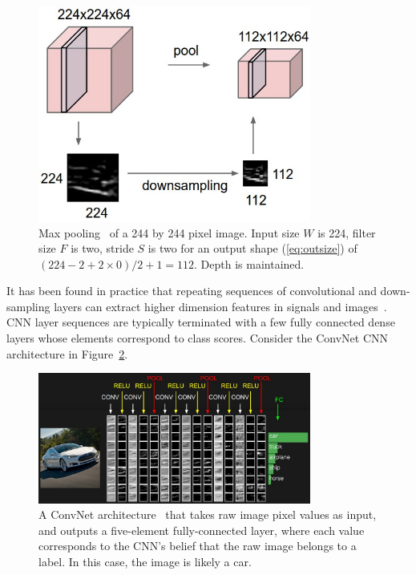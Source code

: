 \begin{figure}[ht!]
	\centering	\includegraphics[width=0.8\textwidth,keepaspectratio]{figs/pool.jpeg}
    \caption{Max pooling~\cite{cs231} of a 244 by 244 pixel image. Input size $W$ is 224, filter size $F$ is two, stride $S$ is two for an output shape (\ref{eq:outsize}) of $(224-2+2\times 0)/2+1=112$. Depth is maintained.}
\label{fig:pool}      
\end{figure}

It has been found in practice that repeating sequences of convolutional and down-sampling layers can extract higher dimension features in signals and images~\cite{cs231}. CNN layer sequences are typically terminated with a few fully connected dense layers whose elements correspond to class scores. Consider the ConvNet CNN architecture in Figure~\ref{fig:convnet}.

\begin{figure}[ht!]
	\centering	\includegraphics[width=0.8\textwidth,keepaspectratio]{figs/convnet.jpeg}
    \caption{A ConvNet architecture~\cite{cs231} that takes raw image pixel values as input, and outputs a five-element fully-connected layer, where each value corresponds to the CNN's belief that the raw image belongs to a label. In this case, the image is likely a car.}
\label{fig:convnet}      
\end{figure}

